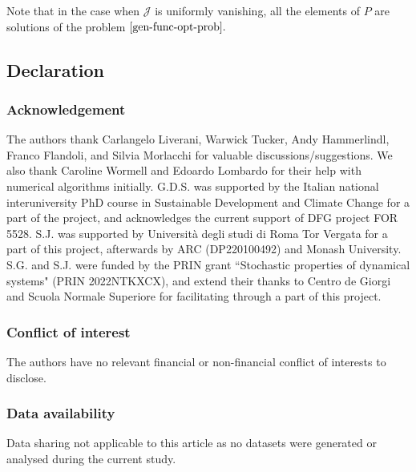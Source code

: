 \documentclass{amsart}
\begin{document}
Note that in the case when $\mathcal{J}$ is uniformly vanishing, all the elements of $P$ are solutions of the problem $\eqref{gen-func-opt-prob}.$


\subsection*{Declaration}

\subsubsection*{Acknowledgement}
The authors thank Carlangelo Liverani, Warwick Tucker, Andy Hammerlindl, Franco Flandoli, and Silvia Morlacchi for valuable discussions/suggestions. We also thank Caroline Wormell and Edoardo Lombardo for their help with numerical algorithms initially. G.D.S. was supported by the Italian national interuniversity PhD course in Sustainable Development and Climate Change for a part of the project, and acknowledges the current support of DFG project FOR 5528. S.J. was supported by  Università degli studi di Roma Tor Vergata for a part of this project, afterwards by ARC (DP220100492) and Monash University. S.G. and S.J. were funded by the PRIN grant “Stochastic properties of dynamical systems" (PRIN 2022NTKXCX), and extend their thanks to Centro de Giorgi and Scuola Normale Superiore for facilitating through a part of this project.

\subsubsection*{Conflict of interest} The authors have no relevant financial or non-financial conflict of interests to disclose.

\subsubsection*{Data availability} Data sharing not applicable to this article as no datasets were generated or analysed during the current study.
\clearpage

 

\end{document}
